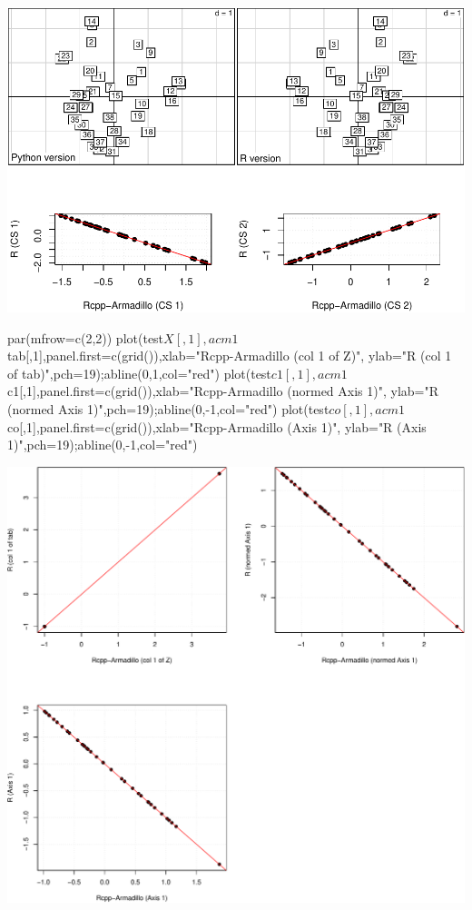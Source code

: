 \documentclass[
  10pt,
]{article}
\newenvironment{Shaded}{\begin{snugshade}}{\end{snugshade}}
\newcommand{\NormalTok}[1]{#1}
\begin{document}
\includegraphics{RandPytonAnalysisPDF_files/figure-latex/unnamed-chunk-69-1.pdf}

\begin{Shaded}
\begin{Highlighting}[]
\NormalTok{par(mfrow=c(2,2))}
\NormalTok{plot(test$X[,1],acm1$tab[,1],panel.first=c(grid()),xlab="Rcpp{-}Armadillo (col 1 of Z)",}
\NormalTok{     ylab="R (col 1 of tab)",pch=19);abline(0,1,col="red")}
\NormalTok{plot(test$c1[,1],acm1$c1[,1],panel.first=c(grid()),xlab="Rcpp{-}Armadillo (normed Axis 1)",}
\NormalTok{     ylab="R (normed Axis 1)",pch=19);abline(0,{-}1,col="red")}
\NormalTok{plot(test$co[,1],acm1$co[,1],panel.first=c(grid()),xlab="Rcpp{-}Armadillo (Axis 1)",}
\NormalTok{     ylab="R (Axis 1)",pch=19);abline(0,{-}1,col="red")}
\end{Highlighting}
\end{Shaded}

\includegraphics{RandPytonAnalysisPDF_files/figure-latex/unnamed-chunk-70-1.pdf}
\end{document}
